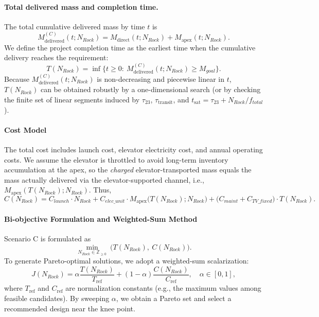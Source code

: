 ﻿\documentclass{mcmthesis}
\begin{document}
\paragraph{Total delivered mass and completion time.}
The total cumulative delivered mass by time $t$ is
\begin{equation}
M_{\text{delivered}}^{(C)}(t;N_{Rock})
=
M_{\text{direct}}(t;N_{Rock})+M_{\text{apex}}(t;N_{Rock}).
\end{equation}
We define the project completion time as the earliest time when the cumulative
delivery reaches the requirement:
\begin{equation}
T(N_{Rock})
=
\inf\Big\{t\ge 0:\ M_{\text{delivered}}^{(C)}(t;N_{Rock})\ge M_{goal}\Big\}.
\label{eq:T_of_N_def}
\end{equation}
Because $M_{\text{delivered}}^{(C)}(t;N_{Rock})$ is non-decreasing and piecewise linear in $t$,
$T(N_{Rock})$ can be obtained robustly by a one-dimensional search (or by checking the finite
set of linear segments induced by $\tau_{23}$, $\tau_{\text{transit}}$, and
$t_{\text{sat}}=\tau_{23}+N_{Rock}/f_{total}$).

\paragraph{Cost Model}
\label{sec:scenarioC_cost}

The total cost includes launch cost, elevator electricity cost, and annual operating costs.
We assume the elevator is throttled to avoid long-term inventory accumulation at the apex,
so the \emph{charged} elevator-transported mass equals the mass actually delivered via the
elevator-supported channel, i.e., $M_{\text{apex}}(T(N_{Rock});N_{Rock})$. Thus,
\begin{equation}
C(N_{Rock})
=
C_{launch}\cdot N_{Rock}
+ C_{elec\_unit}\cdot M_{\text{apex}}\big(T(N_{Rock});N_{Rock}\big)
+ \big(C_{maint}+C_{TV\_fixed}\big)\cdot T(N_{Rock}).
\label{eq:C_of_N}
\end{equation}

\paragraph{Bi-objective Formulation and Weighted-Sum Method}
Scenario C is formulated as
\begin{equation}
\min_{N_{Rock}\in\mathbb{Z}_{\ge 0}}\ \bigl(T(N_{Rock}),\ C(N_{Rock})\bigr).
\end{equation}
To generate Pareto-optimal solutions, we adopt a weighted-sum scalarization:
\begin{equation}
J(N_{Rock})
=
\alpha \frac{T(N_{Rock})}{T_{\text{ref}}}
+
(1-\alpha)\frac{C(N_{Rock})}{C_{\text{ref}}},
\quad \alpha\in[0,1],
\end{equation}
where $T_{\text{ref}}$ and $C_{\text{ref}}$ are normalization constants (e.g., the maximum
values among feasible candidates). By sweeping $\alpha$, we obtain a Pareto set and select
a recommended design near the knee point.
\end{document}
